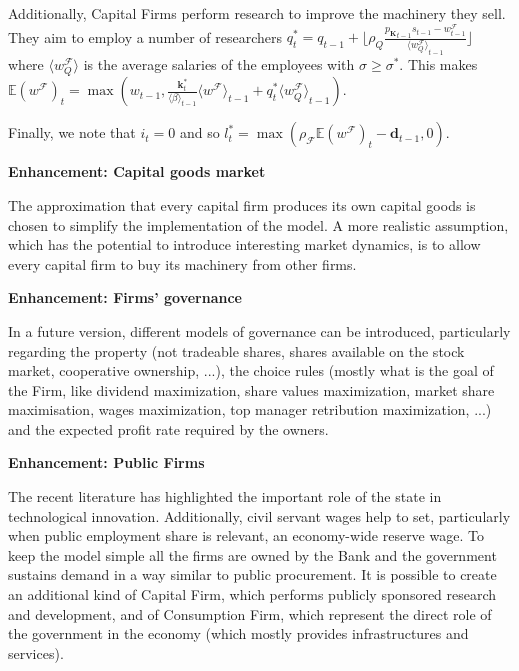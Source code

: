 \documentclass[a4paper, headings=standardclasses]{scrartcl}
\newenvironment{enh}[1][]{\begin{framed}\noindent\textbf{Enhancement: #1}\par}{\end{framed}}
\begin{document}
Additionally, Capital Firms perform research to improve the machinery they sell. They aim to employ a number of researchers $q_t^* = q_{t-1} + \lfloor \rho_Q\frac{{p_\mathbf{K}}_{t-1}s_{t-1} - w^\mathcal{F}_{t-1}}{{\langle w^\mathcal{F}_Q \rangle}_{t-1}} \rfloor$ where $\langle w^\mathcal{F}_Q \rangle$ is the average salaries of the employees with $\sigma \ge \sigma^*$. This makes $\mathbb{E}(w^\mathcal{F})_t = \max(w_{t-1}, \frac{\mathbf{k}^*_t}{{\langle \beta \rangle}_{t-1}}{\langle w^\mathcal{F} \rangle}_{t-1} + q_t^* {\langle w^\mathcal{F}_Q \rangle}_{t-1})$.

Finally, we note that $i_t = 0$ and so $l_t^* = \max(\rho_\mathcal{F} \mathbb{E}(w^\mathcal{F})_t - \mathbf{d}_{t-1}, 0)$.

\begin{enh}[Capital goods market]
    The approximation that every capital firm produces its own capital goods is chosen to simplify the implementation of the model.
    A more realistic assumption, which has the potential to introduce interesting market dynamics, is to allow every capital firm to buy its machinery from other firms.
\end{enh}

\begin{enh}[Firms' governance]
    In a future version, different models of governance can be introduced, particularly regarding the property (not tradeable shares, shares available on the stock market, cooperative ownership, ...), the choice rules (mostly what is the goal of the Firm, like dividend maximization, share values maximization, market share maximisation, wages maximization, top manager retribution maximization, ...) and the expected profit rate required by the owners.
\end{enh}

\begin{enh}[Public Firms]
    The recent literature has highlighted the important role of the state in technological innovation. Additionally, civil servant wages help to set, particularly when public employment share is relevant, an economy-wide reserve wage.
    To keep the model simple all the firms are owned by the Bank and the government sustains demand in a way similar to public procurement.
    It is possible to create an additional kind of Capital Firm, which performs publicly sponsored research and development, and of Consumption Firm, which represent the direct role of the government in the economy (which mostly provides infrastructures and services).
\end{enh}
\end{document}
